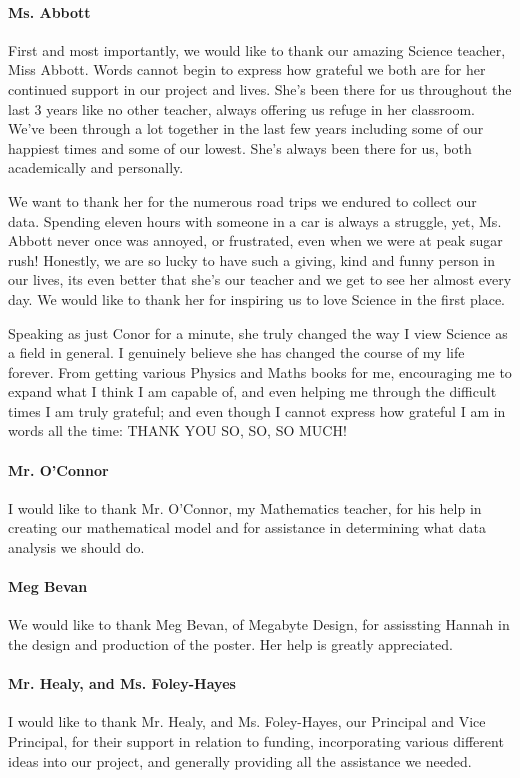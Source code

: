 \paragraph{Ms. Abbott}
First and most importantly, we would like to thank our amazing Science teacher, Miss Abbott. Words cannot begin to express how grateful we both are for her continued support in our project and lives. She's been there for us throughout the last 3 years like no other teacher, always offering us refuge in her classroom. We've been through a lot together in the last few years including some of our happiest times and some of our lowest. She's always been there for us, both academically and personally. 

We want to thank her for the numerous road trips we endured to collect our data. Spending eleven hours with someone in a car is always a struggle, yet, Ms. Abbott never once was annoyed, or frustrated, even when we were at peak sugar rush! Honestly, we are so lucky to have such a giving, kind and funny person in our lives, its even better that she's our teacher and we get to see her almost every day. We would like to thank her for inspiring us to love Science in the first place. 

Speaking as just Conor for a minute, she truly changed the way I view Science as a field in general. I genuinely believe she has changed the course of my life forever. From getting various Physics and Maths books for me, encouraging me to expand what I think I am capable of, and even helping me through the difficult times I am truly grateful; and even though I cannot express how grateful I am in words all the time: THANK YOU SO, SO, SO MUCH! 
\paragraph{Mr. O'Connor}
I would like to thank Mr. O'Connor, my Mathematics teacher, for his help in creating our mathematical model and for assistance in determining what data analysis we should do.
\paragraph{Meg Bevan}
We would like to thank Meg Bevan, of Megabyte Design, for assissting Hannah in the design and production of the poster. Her help is greatly appreciated.
\paragraph{Mr. Healy, and Ms. Foley-Hayes}
I would like to thank Mr. Healy, and Ms. Foley-Hayes, our Principal and Vice Principal, for their support in relation to funding, incorporating various different ideas into our project, and generally providing all the assistance we needed.
